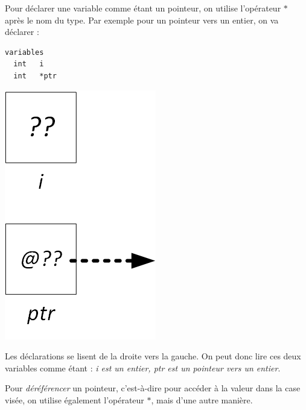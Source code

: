 \documentclass[11pt,a4paper]{article}
\begin{document}
\bigskip

Pour déclarer une variable comme étant un pointeur, on utilise l'opérateur $ * $ après le nom du type.
Par exemple pour un pointeur vers un entier, on va déclarer :

\bigskip

\begin{table}[h!]
  \centering
  \begin{minipage}{0.45\textwidth}
    \centering
\begin{lstlisting}[style=algorithmique]
variables
  int   i
  int   *ptr
\end{lstlisting}
  \end{minipage}
  \hfillx
  \begin{minipage}{0.5\textwidth}
    \centering
\includegraphics[scale=0.75]{img/pointeurs/pointeurs0_1_type.png}
  \end{minipage}
\end{table}

\bigskip

Les déclarations se lisent de la droite vers la gauche.
On peut donc lire ces deux variables comme étant : \textit{i est un entier, ptr est un pointeur vers un entier}.

\medskip

Pour \textit{déréférencer} un pointeur, c'est-à-dire pour accéder à la valeur dans la case visée, on utilise également l'opérateur $ * $, mais d'une autre manière.
\end{document}
